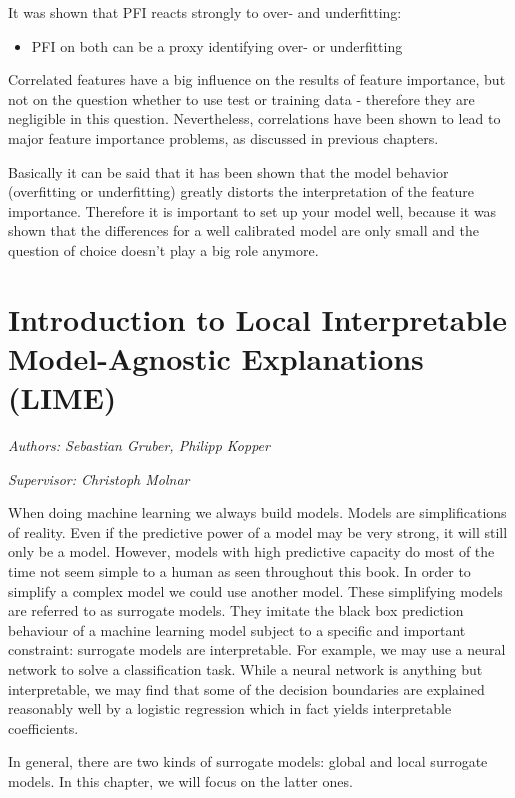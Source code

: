 \documentclass[]{krantz}
\providecommand{\tightlist}{%
  \setlength{\itemsep}{0pt}\setlength{\parskip}{0pt}}
\begin{document}
It was shown that PFI reacts strongly to over- and underfitting:

\begin{itemize}
\tightlist
\item
  PFI on both can be a proxy identifying over- or underfitting
\end{itemize}

Correlated features have a big influence on the results of feature
importance, but not on the question whether to use test or training data
- therefore they are negligible in this question. Nevertheless,
correlations have been shown to lead to major feature importance
problems, as discussed in previous chapters.

Basically it can be said that it has been shown that the model behavior
(overfitting or underfitting) greatly distorts the interpretation of the
feature importance. Therefore it is important to set up your model well,
because it was shown that the differences for a well calibrated model
are only small and the question of choice doesn't play a big role
anymore.

\chapter{Introduction to Local Interpretable Model-Agnostic Explanations
(LIME)}\label{lime}

\emph{Authors: Sebastian Gruber, Philipp Kopper}

\emph{Supervisor: Christoph Molnar}

When doing machine learning we always build models. Models are
simplifications of reality. Even if the predictive power of a model may
be very strong, it will still only be a model. However, models with high
predictive capacity do most of the time not seem simple to a human as
seen throughout this book. In order to simplify a complex model we could
use another model. These simplifying models are referred to as surrogate
models. They imitate the black box prediction behaviour of a machine
learning model subject to a specific and important constraint: surrogate
models are interpretable. For example, we may use a neural network to
solve a classification task. While a neural network is anything but
interpretable, we may find that some of the decision boundaries are
explained reasonably well by a logistic regression which in fact yields
interpretable coefficients.

In general, there are two kinds of surrogate models: global and local
surrogate models. In this chapter, we will focus on the latter ones.
\end{document}

